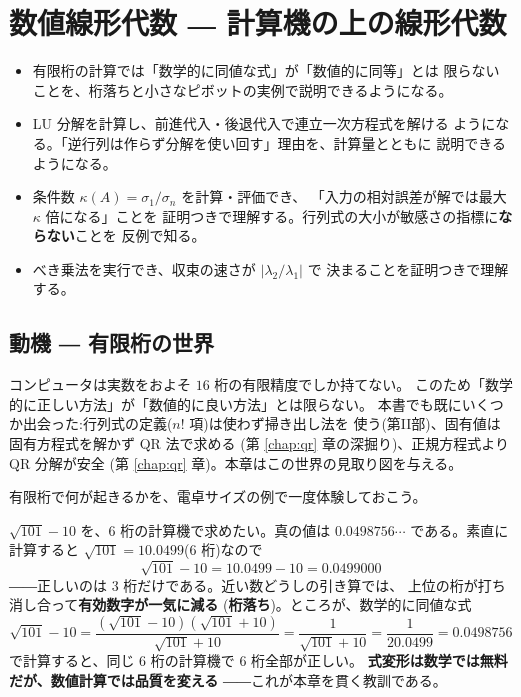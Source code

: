 \chapter{数値線形代数 ― 計算機の上の線形代数}\label{chap:numerical}

\begin{goal}
\begin{itemize}
\item 有限桁の計算では「数学的に同値な式」が「数値的に同等」とは
限らないことを、桁落ちと小さなピボットの実例で説明できるようになる。
\item LU 分解を計算し、前進代入・後退代入で連立一次方程式を解ける
ようになる。「逆行列は作らず分解を使い回す」理由を、計算量とともに
説明できるようになる。
\item 条件数 $\kappa(A) = \sigma_1/\sigma_n$ を計算・評価でき、
「入力の相対誤差が解では最大 $\kappa$ 倍になる」ことを
証明つきで理解する。行列式の大小が敏感さの指標に\textbf{ならない}ことを
反例で知る。
\item べき乗法を実行でき、収束の速さが $|\lambda_2/\lambda_1|$ で
決まることを証明つきで理解する。
\end{itemize}
\end{goal}

\section{動機 ― 有限桁の世界}

コンピュータは実数をおよそ $16$ 桁の有限精度でしか持てない。
このため「数学的に正しい方法」が「数値的に良い方法」とは限らない。
本書でも既にいくつか出会った:行列式の定義($n!$ 項)は使わず掃き出し法を
使う(第II部)、固有値は固有方程式を解かず QR 法で求める
(第 \ref{chap:qr} 章の深掘り)、正規方程式より QR 分解が安全
(第 \ref{chap:qr} 章)。本章はこの世界の見取り図を与える。

有限桁で何が起きるかを、電卓サイズの例で一度体験しておこう。

\begin{rei}\label{rei:num-cancel}
$\sqrt{101} - 10$ を、$6$ 桁の計算機で求めたい。真の値は
$0.0498756\cdots$ である。素直に計算すると
$\sqrt{101} = 10.0499$($6$ 桁)なので
\[
\sqrt{101} - 10 = 10.0499 - 10 = 0.0499000
\]
――正しいのは $3$ 桁だけである。近い数どうしの引き算では、
上位の桁が打ち消し合って\textbf{有効数字が一気に減る}
(\textbf{桁落ち})。ところが、数学的に同値な式
\[
\sqrt{101} - 10 = \frac{(\sqrt{101} - 10)(\sqrt{101} + 10)}{\sqrt{101} + 10}
= \frac{1}{\sqrt{101} + 10} = \frac{1}{20.0499} = 0.0498756
\]
で計算すると、同じ $6$ 桁の計算機で $6$ 桁全部が正しい。
\textbf{式変形は数学では無料だが、数値計算では品質を変える}
――これが本章を貫く教訓である。
\end{rei}

